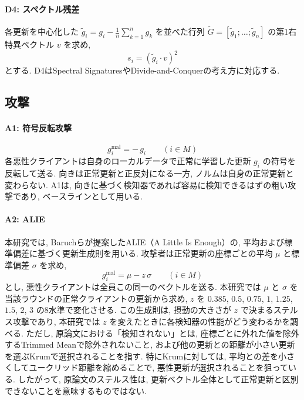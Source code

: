 \documentclass[a4j, twocolumn, dvipdfmx]{jsarticle}
\begin{document}
\paragraph{D4: スペクトル残差}
各更新を中心化した $\tilde{g}_i = g_i - \frac{1}{n}\sum_{k=1}^{n} g_k$ を並べた行列 $\tilde{G} = [\tilde{g}_1;\dots;\tilde{g}_n]$ の第1右特異ベクトル $v$ を求め,
\begin{equation}
s_i = (\tilde{g}_i \cdot v)^2
\end{equation}
とする. D4はSpectral Signatures\cite{tran2018spectral}やDivide-and-Conquer\cite{shejwalkar2021manipulating}の考え方に対応する.

\subsection{攻撃}
\label{sec:attacks}

\paragraph{A1: 符号反転攻撃}
\begin{equation}
g_i^{\text{mal}} = -\,g_i \qquad (i \in M)
\end{equation}
各悪性クライアントは自身のローカルデータで正常に学習した更新 $g_i$ の符号を反転して送る. 向きは正常更新と正反対になる一方, ノルムは自身の正常更新と変わらない. A1は, 向きに基づく検知器であれば容易に検知できるはずの粗い攻撃であり, ベースラインとして用いる.

\paragraph{A2: ALIE}
本研究では, Baruchら\cite{baruch2019little}が提案したALIE（A Little Is Enough）の, 平均および標準偏差に基づく更新生成則を用いる. 攻撃者は正常更新の座標ごとの平均 $\mu$ と標準偏差 $\sigma$ を求め,
\begin{equation}
g_i^{\text{mal}} = \mu - z\,\sigma \qquad (i \in M)
\label{eq:alie}
\end{equation}
とし, 悪性クライアントは全員この同一のベクトルを送る. 本研究では $\mu$ と $\sigma$ を当該ラウンドの正常クライアントの更新から求め, $z$ を $0.385$, $0.5$, $0.75$, $1$, $1.25$, $1.5$, $2$, $3$ の8水準で変化させる. この生成則は, 摂動の大きさが $z$ で決まるステルス攻撃であり, 本研究では $z$ を変えたときに各検知器の性能がどう変わるかを調べる. ただし, 原論文における「検知されない」とは, 座標ごとに外れた値を除外するTrimmed Meanで除外されないこと, および他の更新との距離が小さい更新を選ぶKrumで選択されることを指す. 特にKrumに対しては, 平均との差を小さくしてユークリッド距離を縮めることで, 悪性更新が選択されることを狙っている. したがって, 原論文のステルス性は, 更新ベクトル全体として正常更新と区別できないことを意味するものではない.
\end{document}
